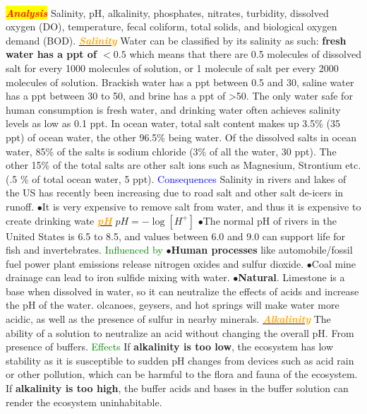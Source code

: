 \documentclass{article}
\newcommand{\ddd}{$\bullet$}
\newcommand{\red}[1]{\textcolor{red}{#1}}
\newcommand{\green}[1]{\textcolor{green}{#1}}
\newcommand{\blue}[1]{\textcolor{blue}{#1}}
\newcommand{\orange}[1]{\textcolor{orange}{#1}}
\newcommand{\mysection}[1]{\colorbox{yellow}{\textbf{\textit{\red{#1}}}}}
\newcommand{\mysubsection}[1]{\underline{\textbf{{\textit{\orange{#1}}}}}}
\newcommand{\mysubsub}[1]{{{\green{#1}}}}
\newcommand{\mysubsubsub}[1]{{{\blue{#1}}}}
\begin{document}
\begin{multicols*}{4}
    \\
    \mysection{Analysis}
        Salinity, pH, alkalinity, phosphates, nitrates, turbidity, dissolved oxygen (DO), temperature, fecal coliform, total solids, and biological oxygen demand (BOD). 
        \mysubsection{Salinity}
            Water can be classified by its salinity as such: \textbf{fresh water has a ppt of $< 0.5$} which means that there are 0.5 molecules of dissolved salt for every 1000 molecules of solution, or 1 molecule of salt per every 2000 molecules of solution. Brackish water has a ppt between 0.5 and 30, saline water has a ppt between 30 to 50, and brine has a ppt of >50. The only water safe for human consumption is fresh water, and drinking water often achieves salinity levels as low as 0.1 ppt. In ocean water, total salt content makes up 3.5\% (35 ppt) of ocean water, the other 96.5\% being water. Of the dissolved salts in ocean water, 85\% of the salts is sodium chloride (3\% of all the water, 30 ppt). The other 15\% of the total salts are other salt ions such as Magnesium, Strontium etc. (.5 \% of total ocean water, 5 ppt). 
            \mysubsubsub{Consequences}
                Salinity in rivers and lakes of the US has recently been increasing due to road salt and other salt de-icers in runoff. \ddd It is very expensive to remove salt from water, and thus it is expensive to create drinking wate
        \mysubsection{pH}
            $pH = - \log [H^+]$
            \ddd  The normal pH of rivers in the United States is 6.5 to 8.5, and values between 6.0 and 9.0 can support life for fish and invertebrates.
            \mysubsub{Influenced by} 
            \ddd \textbf{Human processes} like automobile/fossil fuel power plant emissions release nitrogen oxides and sulfur dioxide.
            \ddd  Coal mine drainage can lead to iron sulfide mixing with water.
            \ddd \textbf{Natural}. Limestone is a base when dissolved in water, so it can neutralize the effects of acids and increase the pH of the water. olcanoes, geysers, and hot springs will make water more acidic, as well as the presence of sulfur in nearby minerals.
        \mysubsection{Alkalinity}
            The ability of a solution to neutralize an acid without changing the overall pH. From presence of buffers. 
            \mysubsub{Effects} If \textbf{alkalinity is too low}, the ecosystem has low stability as it is susceptible to sudden pH changes from devices such as acid rain or other pollution, which can be harmful to the flora and fauna of the ecosystem. If \textbf{alkalinity is too high}, the buffer acids and bases in the buffer solution can render the ecosystem uninhabitable.

\end{multicols*}
\end{document}

